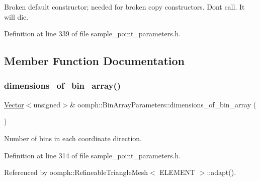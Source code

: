 Broken default constructor; needed for broken copy constructors. Don\textquotesingle{}t call. It will die. 



Definition at line 339 of file sample\+\_\+point\+\_\+parameters.\+h.



\subsection{Member Function Documentation}
\mbox{\label{classoomph_1_1BinArrayParameters_aafb1b653260c401db87ed75c51d06de8}} 
\subsubsection{\texorpdfstring{dimensions\+\_\+of\+\_\+bin\+\_\+array()}{dimensions\_of\_bin\_array()}\hspace{0.1cm}{\footnotesize\ttfamily [1/2]}}
{\footnotesize\ttfamily \hyperlink{classoomph_1_1Vector}{Vector}$<$unsigned$>$\& oomph\+::\+Bin\+Array\+Parameters\+::dimensions\+\_\+of\+\_\+bin\+\_\+array (\begin{DoxyParamCaption}{ }\end{DoxyParamCaption})\hspace{0.3cm}{\ttfamily [inline]}}



Number of bins in each coordinate direction. 



Definition at line 314 of file sample\+\_\+point\+\_\+parameters.\+h.



Referenced by oomph\+::\+Refineable\+Triangle\+Mesh$<$ E\+L\+E\+M\+E\+N\+T $>$\+::adapt().

\mbox{\label{classoomph_1_1BinArrayParameters_a9f14007784881e7da72d48d80dcaebc9}} 
